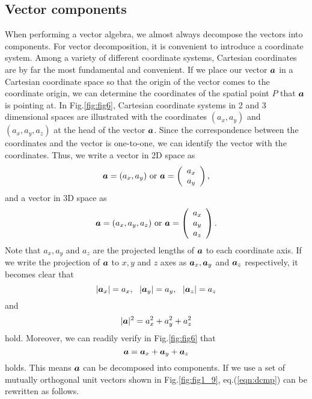 \documentclass[10pt,a4j]{article}
\begin{document}
\subsection{Vector components}
When performing a vector algebra, we almost always decompose the vectors into components. For vector decomposition, it is convenient to introduce a coordinate system. Among a variety of different coordinate systems, Cartesian coordinates are by far the most fundamental and convenient.
If we place our vector $\mbox{\boldmath $a$}$ in a Cartesian coordinate space so that the origin of the vector comes 
to the coordinate origin, we can determine the coordinates of the spatial point $P$ that $\mbox{\boldmath $a$}$ is pointing at. 
In Fig.\ref{fig:fig6}, Cartesian coordinate systems in 2 and 3 dimensional spaces are illustrated with the coordinates $(a_x,a_y)$ and $(a_x,a_y,a_z)$ at the head of the vector $\mbox{\boldmath $a$}$.  Since the correspondence between the coordinates and the vector is one-to-one, we can identify the vector with the coordinates. Thus, we write a vector in 2D space as 
\[
    \mbox{\boldmath $a$}=(a_x, a_y) \ {\rm or} 
    \
    \mbox{\boldmath $a$}=\left(
    \begin{array}{c}
        a_x \\
        a_y
    \end{array}
    \right), 
\]
and a vector in 3D space as 
\[
    \mbox{\boldmath $a$}=(a_x, a_y, a_z) \ {\rm or} 
    \
    \mbox{\boldmath $a$}=\left(
    \begin{array}{c}
        a_x \\
        a_y \\
        a_z
    \end{array}
    \right). 
\]
Note that $a_x, a_y$ and $a_z$ are the projected lengths of $\mbox{\boldmath $a$}$ to each coordinate axis. If we write the projection of $\mbox{\boldmath $a$}$ to $x, y$ and $z$ axes as $\mbox{\boldmath $a$}_x,\mbox{\boldmath $a$}_y$ 
and $\mbox{\boldmath $a$}_z$ respectively, it becomes clear that 
\begin{equation}
    |\mbox{\boldmath $a$}_x|=a_x, \ \ |\mbox{\boldmath $a$}_y|=a_y, \ \ |\mbox{\boldmath $a$}_z|=a_z
    \label{eqn:}
\end{equation}
and
\begin{equation}
    |\mbox{\boldmath $a$}|^2=a_x^2+a_y^2+a_z^2
    \label{eqn:}
\end{equation}
hold. Moreover, we can readily verify in Fig.\ref{fig:fig6} that 
\begin{equation}
    \mbox{\boldmath $a$}=\mbox{\boldmath $a$}_x+\mbox{\boldmath $a$}_y+\mbox{\boldmath $a$}_z
    \label{eqn:dcmp}
\end{equation}
holds. This means $\mbox{\boldmath $a$}$ can be decomposed into components. If we use a set of mutually orthogonal unit vectors shown in Fig.\ref{fig:fig1_9}, eq.(\ref{eqn:dcmp}) can be rewritten as follows.
\end{document}
